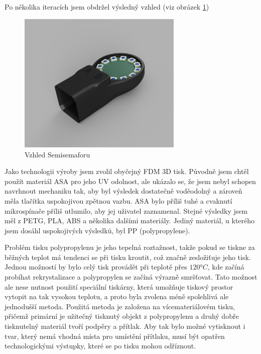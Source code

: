 Po několika iteracích jsem obdržel výsledný vzhled (viz obrázek \ref{Semisemafor-box-render})
\begin{figure}[!h]
  \begin{center}
    \includegraphics[width=0.7\textwidth]{text/PraktickaCast/img/Semisemafor-BOX-render.png}
  \end{center}
  \label{Semisemafor-box-render}
  \caption{Vzhled Semisemaforu}
\end{figure}

Jako technologii výroby jsem zvolil obyčejný FDM 3D tisk.
Původně jsem chtěl použít materiál ASA pro jeho UV odolnost, ale ukázalo se, že jsem nebyl schopen navrhnout mechaniku tak, aby byl výsledek dostatečně voděodolný a zároveň měla tlačítka uspokojivou zpětnou vazbu.
ASA bylo příliš tuhé a cvaknutí mikrospínače příliš utlumilo, aby jej uživatel zaznamenal.
Stejné výsledky jsem měl z PETG, PLA, ABS a několika dalšími materiály. Jediný materiál, u kterého jsem dosáhl uspokojivých výsledků, byl PP (polypropylene).

Problém tisku polypropylenu je jeho tepelná roztažnost, takže pokud se tiskne za běžných teplot má tendenci se při tisku kroutit, což značně zesložiťuje jeho tisk.
Jednou možností by bylo celý tisk provádět při teplotě přes \(120°C\), kde začíná probíhat rekrystalizace a polypropylen se začíná výrazně smršťovat.
Tato možnost ale nese nutnost použití speciální tiskárny, která umožňuje tiskový prostor vytopit na tak vysokou teplotu, a proto byla zvolena méně spolehlivá ale jednodušší metoda.
Použitá metoda je založena na vícemateriálovém tisku, přičemž primární je užitečný tisknutý objekt z polypropylenu a druhý dobře tisknutelný materiál tvoří podpěry a přítlak.
Aby tak bylo možné vytisknout i tvar, který nemá vhodná místa pro umístění přítlaku, musí být opatřen technologickými výstupky, které se po tisku mohou odříznout.

